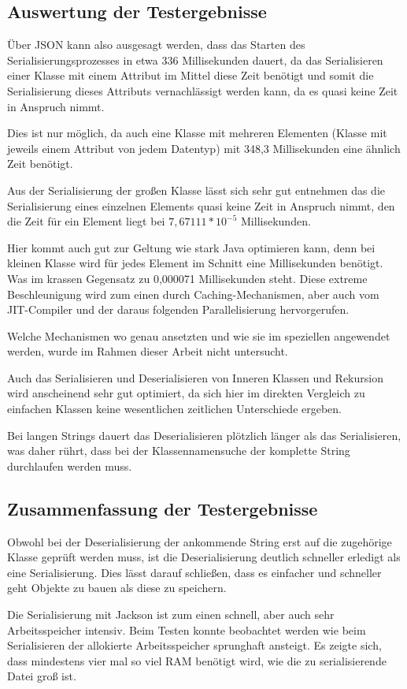 \subsection{Auswertung der Testergebnisse}
\"Uber JSON kann also ausgesagt werden, dass das Starten des Serialisierungsprozesses in etwa 336 Millisekunden dauert, da das Serialisieren einer Klasse mit einem Attribut im Mittel diese Zeit ben\"otigt und somit die Serialisierung dieses Attributs vernachl\"assigt werden kann, da es quasi keine Zeit in Anspruch nimmt.

Dies ist nur m\"oglich, da auch eine Klasse mit mehreren Elementen (Klasse mit jeweils einem Attribut von jedem Datentyp) mit 348,3 Millisekunden eine \"ahnlich Zeit ben\"otigt.

Aus der Serialisierung der gro\ss{}en Klasse l\"asst sich sehr gut entnehmen das die Serialisierung eines einzelnen Elements quasi keine Zeit in Anspruch nimmt, den die Zeit f\"ur ein Element liegt bei $7,67111*10^{-5}$ Millisekunden. 

Hier kommt auch gut zur Geltung wie stark Java optimieren kann, denn bei kleinen Klasse wird f\"ur jedes Element im Schnitt eine Millisekunden ben\"otigt. Was im krassen Gegensatz zu 0,000071 Millisekunden steht. Diese extreme Beschleunigung wird zum einen durch Caching-Mechanismen, aber auch vom JIT-Compiler und der daraus folgenden Parallelisierung hervorgerufen. 

Welche Mechanismen wo genau ansetzten und wie sie im speziellen angewendet werden, wurde im Rahmen dieser Arbeit nicht untersucht.

Auch das Serialisieren und Deserialisieren von Inneren Klassen und Rekursion wird anscheinend sehr gut optimiert, da sich hier im direkten Vergleich zu einfachen Klassen keine wesentlichen zeitlichen Unterschiede ergeben.

Bei langen Strings dauert das Deserialisieren pl\"otzlich l\"anger als das Serialisieren, was daher r\"uhrt, dass bei der Klassennamensuche der komplette String durchlaufen werden muss.

\subsection{Zusammenfassung der Testergebnisse}
Obwohl bei der Deserialisierung der ankommende String erst auf die zugeh\"orige Klasse gepr\"uft werden muss, ist die Deserialisierung deutlich schneller erledigt als eine Serialisierung. Dies l\"asst darauf schlie\ss{}en, dass es einfacher und schneller geht Objekte zu bauen als diese zu speichern.

Die Serialisierung mit Jackson ist zum einen schnell, aber auch sehr Arbeitsspeicher intensiv. Beim Testen konnte beobachtet werden wie beim Serialisieren der allokierte Arbeitsspeicher sprunghaft ansteigt. Es zeigte sich, dass mindestens vier mal so viel RAM ben\"otigt wird, wie die zu serialisierende Datei gro\ss{} ist. 






